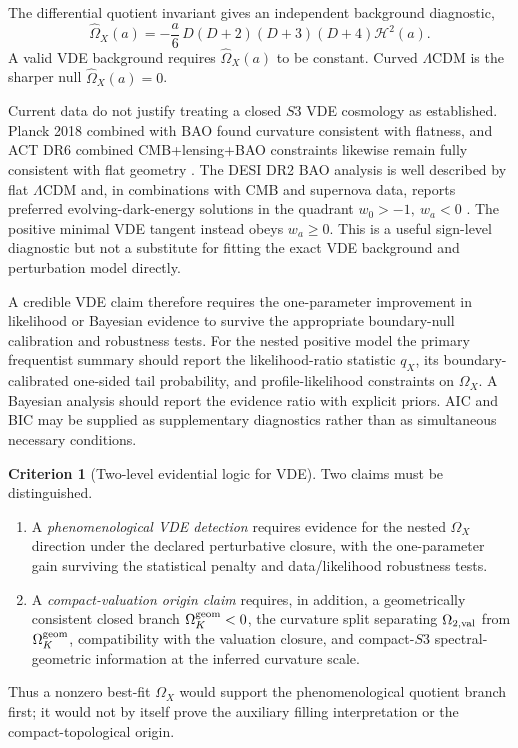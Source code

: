 \documentclass[11pt,a4paper]{article}
\def\Sthree{S3}%
\def\Dil{D}%
\numberwithin{equation}{section}
\theoremstyle{definition}
\newtheorem{criterion}{Criterion}
\theoremstyle{plain}
\theoremstyle{remark}
\newcommand{\Sthree}{S^3}
\newcommand{\Dil}{\mathscr{D}}
\begin{document}
The differential quotient invariant gives an independent background diagnostic,
\begin{equation}
\widehat\Omega_X(a)
=-\frac a6\,\Dil(\Dil+2)(\Dil+3)(\Dil+4)\mathcal H^2(a).
\end{equation}
A valid VDE background requires \(\widehat\Omega_X(a)\) to be constant. Curved \(\Lambda\)CDM is the sharper null \(\widehat\Omega_X(a)=0\).

Current data do not justify treating a closed \(\Sthree\) VDE cosmology as established. Planck 2018 combined with BAO found curvature consistent with flatness, and ACT DR6 combined CMB+lensing+BAO constraints likewise remain fully consistent with flat geometry \cite{Planck2018Parameters,ACTDR6Extended2025}. The DESI DR2 BAO analysis is well described by flat \(\Lambda\)CDM and, in combinations with CMB and supernova data, reports preferred evolving-dark-energy solutions in the quadrant \(w_0>-1,\ w_a<0\) \cite{DESI2025DR2BAO}. The positive minimal VDE tangent instead obeys \(w_a\ge0\). This is a useful sign-level diagnostic but not a substitute for fitting the exact VDE background and perturbation model directly.

A credible VDE claim therefore requires the one-parameter improvement in likelihood or Bayesian evidence to survive the appropriate boundary-null calibration and robustness tests. For the nested positive model the primary frequentist summary should report the likelihood-ratio statistic \(q_X\), its boundary-calibrated one-sided tail probability, and profile-likelihood constraints on \(\Omega_X\). A Bayesian analysis should report the evidence ratio with explicit priors. AIC and BIC may be supplied as supplementary diagnostics rather than as simultaneous necessary conditions.

\begin{criterion}[Two-level evidential logic for VDE]
Two claims must be distinguished.
\begin{enumerate}
\item A \emph{phenomenological VDE detection} requires evidence for the nested \(\Omega_X\) direction under the declared perturbative closure, with the one-parameter gain surviving the statistical penalty and data/likelihood robustness tests.
\item A \emph{compact-valuation origin claim} requires, in addition, a geometrically consistent closed branch \(\Omega_K^{\rm geom}<0\), the curvature split separating \(\Omega_{2,\rm val}\) from \(\Omega_K^{\rm geom}\), compatibility with the valuation closure, and compact-\(\Sthree\) spectral-geometric information at the inferred curvature scale.
\end{enumerate}
Thus a nonzero best-fit \(\Omega_X\) would support the phenomenological quotient branch first; it would not by itself prove the auxiliary filling interpretation or the compact-topological origin.
\end{criterion}
\end{document}
